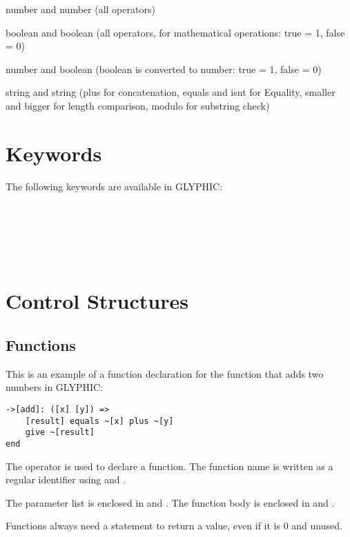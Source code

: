 number and number (all operators)
    
boolean and boolean (all operators, for mathematical operations: true = 1, false = 0)
    
number and boolean (boolean is converted to number: true = 1, false = 0)
    
string and string (plus for concatenation, equals and isnt for Equality, smaller and bigger for length comparison, modulo for substring check)

\section{Keywords}
The following keywords are available in GLYPHIC:
    \\
    \\
    \\
    \\
    \\
    \\


\section{Control Structures}

\subsection{Functions}
This is an example of a function declaration for the function  that adds two numbers in GLYPHIC:

\begin{Verbatim}[commandchars=none, frame=single]
->[add]: ([x] [y]) =>
    [result] equals ~[x] plus ~[y]
    give ~[result]
end
\end{Verbatim}

The \greybox{->} operator is used to declare a function. The function name is written as a regular identifier using \greybox{[} and \greybox{]}.

The parameter list is enclosed in \greybox{(} and \greybox{)}. The function body is enclosed in \greybox{=>} and .

Functions always need a  statement to return a value, even if it is 0 and unused.

